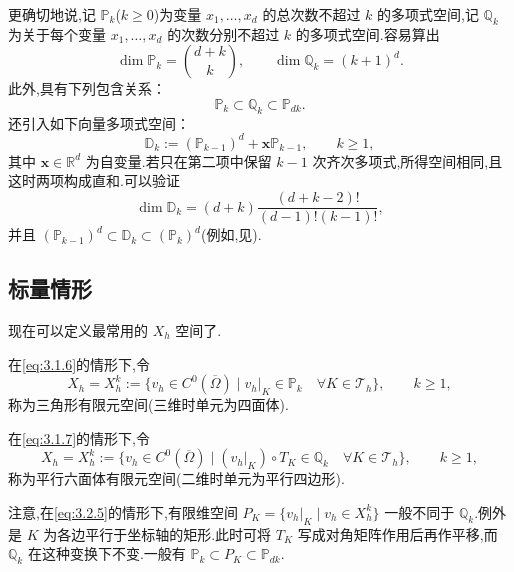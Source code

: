 更确切地说,记 \(\mathbb P_k\)(\(k\ge0\))为变量 \(x_1,\ldots,x_d\) 的总次数不超过 \(k\) 的多项式空间,记 \(\mathbb Q_k\) 为关于每个变量 \(x_1,\ldots,x_d\) 的次数分别不超过 \(k\) 的多项式空间.容易算出
\begin{equation}\label{eq:3.2.1}
  \dim\mathbb P_k=\binom{d+k}{k},\qquad
  \dim\mathbb Q_k=(k+1)^d.
\end{equation}
此外,具有下列包含关系：
\[
  \mathbb P_k\subset\mathbb Q_k\subset\mathbb P_{dk}.
\]
还引入如下向量多项式空间：
\begin{equation}\label{eq:3.2.2}
  \mathbb D_k:=(\mathbb P_{k-1})^d+\boldsymbol{x}\mathbb P_{k-1},
    \qquad k\ge1,
\end{equation}
其中 \(\boldsymbol{x}\in\mathbb R^d\) 为自变量.若只在第二项中保留 \(k-1\) 次齐次多项式,所得空间相同,且这时两项构成直和.可以验证
\begin{equation}\label{eq:3.2.3}
  \dim\mathbb D_k=(d+k)\frac{(d+k-2)!}{(d-1)!(k-1)!},
\end{equation}
并且 \((\mathbb P_{k-1})^d\subset\mathbb D_k\subset(\mathbb P_k)^d\)(例如,见).

\subsection{标量情形}\label{sec:3.2.1}

现在可以定义最常用的 \(X_h\) 空间了.

\begin{definition*}[三角形有限元空间]
在\eqref{eq:3.1.6}的情形下,令
\begin{equation}\label{eq:3.2.4}
  X_h=X_h^k:=\bigl\{v_h\in C^0(\overline\Omega)\mid
  v_h|_K\in\mathbb P_k\quad\forall K\in\mathcal T_h\bigr\},
  \qquad k\ge1,
\end{equation}
称为三角形有限元空间(三维时单元为四面体).
\end{definition*}

\begin{definition*}[平行六面体有限元空间]
在\eqref{eq:3.1.7}的情形下,令
\begin{equation}\label{eq:3.2.5}
  X_h=X_h^k:=\bigl\{v_h\in C^0(\overline\Omega)\mid
   (v_h|_K)\circ T_K\in\mathbb Q_k\quad\forall K\in\mathcal T_h\bigr\},
  \qquad k\ge1,
\end{equation}
称为平行六面体有限元空间(二维时单元为平行四边形).
\end{definition*}

注意,在\eqref{eq:3.2.5}的情形下,有限维空间 \(P_K=\{v_h|_K\mid v_h\in X_h^k\}\) 一般不同于 \(\mathbb Q_k\).例外是 \(K\) 为各边平行于坐标轴的矩形.此时可将 \(T_K\) 写成对角矩阵作用后再作平移,而 \(\mathbb Q_k\) 在这种变换下不变.一般有 \(\mathbb P_k\subset P_K\subset\mathbb P_{dk}\).


